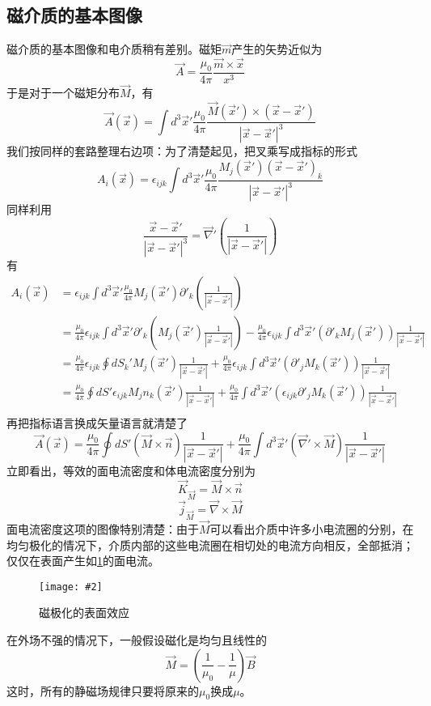\documentclass[a4paper,11pt]{ctexbook}
\newcommand{\cpic}[2]{
\begin{center}
\texttt{[image: \#2]}
\end{center}
}
\newcommand{\cpicn}[3]
{
\begin{figure}[H]
\cpic{#1}{#2}
\caption{#3\label{#2}}
\end{figure}
}
\newcommand{\beq}{\begin{equation}}
\newcommand{\eeq}{\end{equation}}
\newcommand{\bea}{\begin{equation}\begin{aligned}}
\newcommand{\eea}{\end{aligned}\end{equation}}
\newcommand{\del}{\vec{\nabla}}
\begin{document}
\subsection{磁介质的基本图像}
磁介质的基本图像和电介质稍有差别。磁矩$\vec m$产生的矢势近似为
\beq
\vec A = \frac{\mu_0}{4\pi} \frac{\vec m \times \vec x}{x^3}
\eeq
于是对于一个磁矩分布$\vec M$，有
\beq
\vec A (\vec x) = \int d^3 \vec{x}' \frac{\mu_0}{4\pi} \frac{\vec M(\vec{x}') \times ( \vec x - \vec{x}')}{|\vec x - \vec{x}'|^3}
\eeq
我们按同样的套路整理右边项：为了清楚起见，把叉乘写成指标的形式
\beq
A_i (\vec x) =\epsilon_{ijk}  \int d^3 \vec{x}' \frac{\mu_0}{4\pi} \frac{M_j (\vec{x}') ( \vec x - \vec{x}')_k}{|\vec x - \vec{x}'|^3}
\eeq
同样利用
\beq
\frac{\vec x  - \vec{x}'}{|\vec x - \vec{x}'|^3} = \del' \left( \frac{1}{|\vec x - \vec{x}'|}\right)
\eeq
有
\bea
A_i (\vec x) &=\epsilon_{ijk}  \int d^3 \vec{x}' \frac{\mu_0}{4\pi} M_j (\vec{x}') \partial'_k\left( \frac{1}{|\vec x - \vec{x}'|}\right) \\
&= \frac{\mu_0}{4\pi}  \epsilon_{ijk}  \int d^3 \vec{x}'  \partial'_k \left(M_j (\vec{x}')\frac{1}{|\vec x - \vec{x}'|}\right)- \frac{\mu_0}{4\pi}  \epsilon_{ijk}  \int d^3 \vec{x}' \left( \partial'_k M_j (\vec{x}')\right)\frac{1}{|\vec x - \vec{x}'|}\\
&=  \frac{\mu_0}{4\pi}  \epsilon_{ijk}  \oint dS_k'  M_j (\vec{x}')\frac{1}{|\vec x - \vec{x}'|}+ \frac{\mu_0}{4\pi}  \epsilon_{ijk}  \int d^3 \vec{x}' \left( \partial'_j M_k (\vec{x}')\right)\frac{1}{|\vec x - \vec{x}'|}\\
&=  \frac{\mu_0}{4\pi} \oint dS'  \epsilon_{ijk}  M_j n_k (\vec{x}')\frac{1}{|\vec x - \vec{x}'|}+ \frac{\mu_0}{4\pi}  \int d^3 \vec{x}' \left( \epsilon_{ijk}  \partial'_j M_k (\vec{x}')\right)\frac{1}{|\vec x - \vec{x}'|}\\
 \eea
 再把指标语言换成矢量语言就清楚了
 \beq
 \vec A (\vec x) = \frac{\mu_0}{4\pi} \oint dS' ( \vec M \times \vec n )\frac{1}{|\vec x - \vec{x}'|} + \frac{\mu_0}{4\pi} \int d^3 \vec{x}' (\del' \times \vec M) \frac{1}{|\vec x - \vec{x}'|}
 \eeq
 立即看出，等效的面电流密度和体电流密度分别为
 \beq
 \vec K_{\vec M} = \vec M \times \vec n
 \eeq
 \beq
 \vec{j}_{\vec M} = \del \times \vec M
 \eeq
 面电流密度这项的图像特别清楚：由于$\vec M$可以看出介质中许多小电流圈的分别，在均匀极化的情况下，介质内部的这些电流圈在相切处的电流方向相反，全部抵消；仅仅在表面产生如\cref{mag_pol}的面电流。
 \cpicn{0.2}{mag_pol}{磁极化的表面效应}
 \par
 在外场不强的情况下，一般假设磁化是均匀且线性的
 \beq
 \vec M = \left( \frac{1}{\mu_0} - \frac{1}{\mu} \right) \vec B
 \eeq
 这时，所有的静磁场规律只要将原来的$\mu_0$换成$\mu$。
\end{document}
